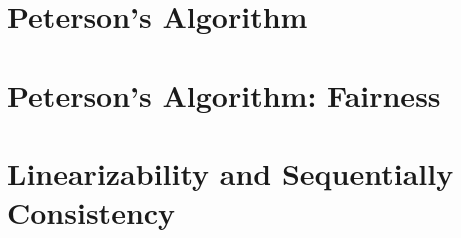 \documentclass{article}
\begin{document}
	\pagestyle{fancy}
	
	\section{Peterson's Algorithm}
	\begin{adjustwidth}{2em}{2em}
	\end{adjustwidth}
	
	\section{Peterson's Algorithm: Fairness}
	\begin{adjustwidth}{2em}{2em}
	\end{adjustwidth}
	
	\section{Linearizability and Sequentially Consistency}
\end{document}
